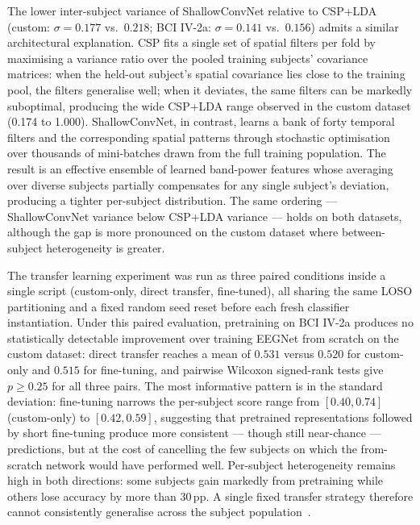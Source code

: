 \documentclass[english, bc, kiv, he, iso690alph, pdf]{fasthesis}
\begin{document}
The lower inter-subject variance of ShallowConvNet relative to CSP+LDA (custom: $\sigma = 0.177$ vs.\ $0.218$; BCI IV-2a: $\sigma = 0.141$ vs.\ $0.156$) admits a similar architectural explanation. CSP fits a single set of spatial filters per fold by maximising a variance ratio over the pooled training subjects' covariance matrices: when the held-out subject's spatial covariance lies close to the training pool, the filters generalise well; when it deviates, the same filters can be markedly suboptimal, producing the wide CSP+LDA range observed in the custom dataset (0.174 to 1.000). ShallowConvNet, in contrast, learns a bank of forty temporal filters and the corresponding spatial patterns through stochastic optimisation over thousands of mini-batches drawn from the full training population. The result is an effective ensemble of learned band-power features whose averaging over diverse subjects partially compensates for any single subject's deviation, producing a tighter per-subject distribution. The same ordering --- ShallowConvNet variance below CSP+LDA variance --- holds on both datasets, although the gap is more pronounced on the custom dataset where between-subject heterogeneity is greater.

The transfer learning experiment was run as three paired conditions inside a single script (custom-only, direct transfer, fine-tuned), all sharing the same LOSO partitioning and a fixed random seed reset before each fresh classifier instantiation. Under this paired evaluation, pretraining on BCI IV-2a produces no statistically detectable improvement over training EEGNet from scratch on the custom dataset: direct transfer reaches a mean of $0.531$ versus $0.520$ for custom-only and $0.515$ for fine-tuning, and pairwise Wilcoxon signed-rank tests give $p \geq 0.25$ for all three pairs. The most informative pattern is in the standard deviation: fine-tuning narrows the per-subject score range from $[0.40, 0.74]$ (custom-only) to $[0.42, 0.59]$, suggesting that pretrained representations followed by short fine-tuning produce more consistent --- though still near-chance --- predictions, but at the cost of cancelling the few subjects on which the from-scratch network would have performed well. Per-subject heterogeneity remains high in both directions: some subjects gain markedly from pretraining while others lose accuracy by more than $30$\,pp. A single fixed transfer strategy therefore cannot consistently generalise across the subject population~\cite{lotte2018review,wu2022transfer}.

\end{document}
